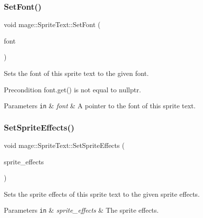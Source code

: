 \subsubsection{\texorpdfstring{Set\+Font()}{SetFont()}}
{\footnotesize\ttfamily void mage\+::\+Sprite\+Text\+::\+Set\+Font (\begin{DoxyParamCaption}\item[{\hyperlink{namespacemage_a1e01ae66713838a7a67d30e44c67703e}{Shared\+Ptr}$<$ const \hyperlink{classmage_1_1_sprite_font}{Sprite\+Font} $>$}]{font }\end{DoxyParamCaption})\hspace{0.3cm}{\ttfamily [noexcept]}}

Sets the font of this sprite text to the given font.

\begin{DoxyPrecond}{Precondition}
{\ttfamily font.\+get()} is not equal to {\ttfamily nullptr}. 
\end{DoxyPrecond}

\begin{DoxyParams}[1]{Parameters}
\mbox{\tt in}  & {\em font} & A pointer to the font of this sprite text. \\
\hline
\end{DoxyParams}
\hypertarget{classmage_1_1_sprite_text_ab457137566eb5a57562c7ff6d387fc93}{}\label{classmage_1_1_sprite_text_ab457137566eb5a57562c7ff6d387fc93} 
\subsubsection{\texorpdfstring{Set\+Sprite\+Effects()}{SetSpriteEffects()}}
{\footnotesize\ttfamily void mage\+::\+Sprite\+Text\+::\+Set\+Sprite\+Effects (\begin{DoxyParamCaption}\item[{\hyperlink{namespacemage_ad62ebdf0e7aae0caf1535a4ea3f056ea}{Sprite\+Effect}}]{sprite\+\_\+effects }\end{DoxyParamCaption})\hspace{0.3cm}{\ttfamily [noexcept]}}

Sets the sprite effects of this sprite text to the given sprite effects.


\begin{DoxyParams}[1]{Parameters}
\mbox{\tt in}  & {\em sprite\+\_\+effects} & The sprite effects. \\
\hline
\end{DoxyParams}
\hypertarget{classmage_1_1_sprite_text_a6853a914502bb28cfc4dc14160345542}{}\label{classmage_1_1_sprite_text_a6853a914502bb28cfc4dc14160345542} 
